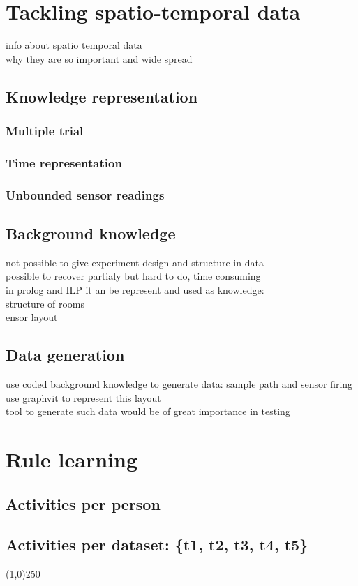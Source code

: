 \documentclass[12pt, a4paper, pdflatex, leqno, twoside]{report}
\begin{document}
\chapter{Tackling spatio-temporal data}

info about spatio temporal data\\
why they are so important and wide spread\\

\section{Knowledge representation}
\subsection{Multiple trial}
\subsection{Time representation}
\subsection{Unbounded sensor readings}

\section{Background knowledge}
not possible to give experiment design and structure in data\\
possible to recover partialy but hard to do, time consuming\\

in prolog and ILP it an be represent and used as knowledge:\\
structure of rooms\\
ensor layout\\


\section{Data generation}
use coded background knowledge to generate data: sample path and sensor firing\\
use graphvit to represent this layout\\
tool to generate such data would be of great importance in testing 

\section{}



\chapter{Rule learning}
\section{Activities per person}
\section{Activities per dataset: \{t1, t2, t3, t4, t5\}}



\begin{center}
\noindent \line(1,0){250}
\end{center}

{}

% 
\end{document}
